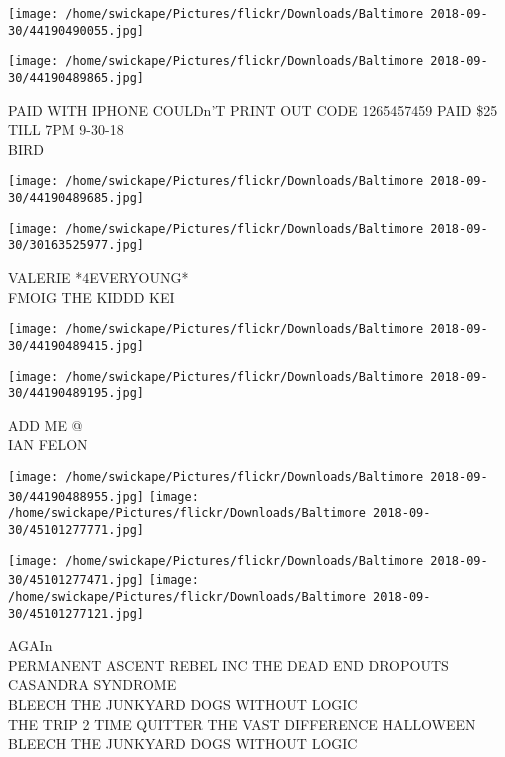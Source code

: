 \documentclass[10pt,letterpaper]{article}
\begin{document}
\texttt{[image: /home/swickape/Pictures/flickr/Downloads/Baltimore 2018-09-30/44190490055.jpg]}

\vspace{0.25in}
\texttt{[image: /home/swickape/Pictures/flickr/Downloads/Baltimore 2018-09-30/44190489865.jpg]}

PAID WITH IPHONE COULDn'T PRINT OUT CODE 1265457459 PAID \$25 TILL 7PM 9{-}30{-}18\\
BIRD\\
\pagebreak

\texttt{[image: /home/swickape/Pictures/flickr/Downloads/Baltimore 2018-09-30/44190489685.jpg]}

\vspace{0.25in}
\texttt{[image: /home/swickape/Pictures/flickr/Downloads/Baltimore 2018-09-30/30163525977.jpg]}

VALERIE *4EVERYOUNG*\\
FMOIG THE KIDDD KEI\\
\pagebreak

\texttt{[image: /home/swickape/Pictures/flickr/Downloads/Baltimore 2018-09-30/44190489415.jpg]}

\vspace{0.25in}
\texttt{[image: /home/swickape/Pictures/flickr/Downloads/Baltimore 2018-09-30/44190489195.jpg]}

ADD ME @\\
IAN FELON\\
\pagebreak

\texttt{[image: /home/swickape/Pictures/flickr/Downloads/Baltimore 2018-09-30/44190488955.jpg]}
\texttt{[image: /home/swickape/Pictures/flickr/Downloads/Baltimore 2018-09-30/45101277771.jpg]}

\texttt{[image: /home/swickape/Pictures/flickr/Downloads/Baltimore 2018-09-30/45101277471.jpg]}
\texttt{[image: /home/swickape/Pictures/flickr/Downloads/Baltimore 2018-09-30/45101277121.jpg]}

AGAIn\\
PERMANENT ASCENT REBEL INC THE DEAD END DROPOUTS CASANDRA SYNDROME\\
BLEECH THE JUNKYARD DOGS WITHOUT LOGIC\\
THE TRIP 2 TIME QUITTER THE VAST DIFFERENCE HALLOWEEN BLEECH THE JUNKYARD DOGS WITHOUT LOGIC\\
\pagebreak
\end{document}
